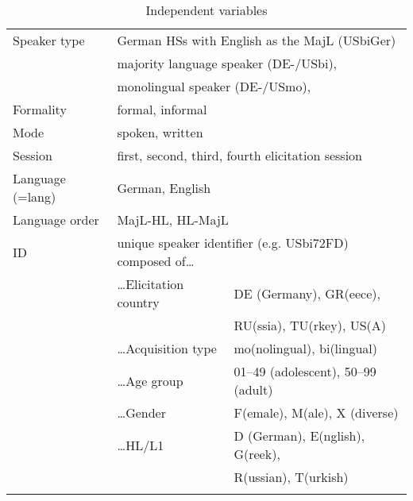 \documentclass[output=paper,colorlinks,citecolor=brown]{langscibook}
\begin{document}
\begin{table}[!ht]
    \caption{Independent variables}
    \begin{tabular}{lll}
        \lsptoprule
        Speaker type & \multicolumn{2}{l}{German HSs with English as the MajL (USbiGer)}\\
        ~ & \multicolumn{2}{l}{majority language speaker (DE-/USbi),} \\
        ~ & \multicolumn{2}{l}{monolingual speaker (DE-/USmo),} \\
        Formality & \multicolumn{2}{l}{formal, informal} \\
        Mode & \multicolumn{2}{l}{spoken, written} \\
        Session & \multicolumn{2}{l}{first, second, third, fourth elicitation session} \\
        Language (=lang) & \multicolumn{2}{l}{German, English} \\
        Language order & \multicolumn{2}{l}{MajL-HL, HL-MajL}\\
        ID & \multicolumn{2}{l}{unique speaker identifier (e.g. USbi72FD) composed of\dots} \\
        ~ & \dots Elicitation country & DE (Germany), GR(eece), \\
        ~ & ~ & RU(ssia), TU(rkey), US(A) \\
        ~ & \dots Acquisition type & mo(nolingual), bi(lingual) \\
        ~ & \dots Age group & 01--49 (adolescent), 50--99 (adult) \\
        ~ & \dots Gender & F(emale), M(ale), X (diverse) \\
        ~ & \dots HL/L1 & D (German), E(nglish), G(reek), \\
        ~ & ~ & R(ussian), T(urkish) \\
        \lspbottomrule
    \end{tabular}
    \label{tab:kelleretal:independentvars}
\end{table}

\begin{table}[!ht]
    \caption{Final model structures}
    \small
    \label{tab:kelleretal:modelstructure}
\end{table}
\end{document}
